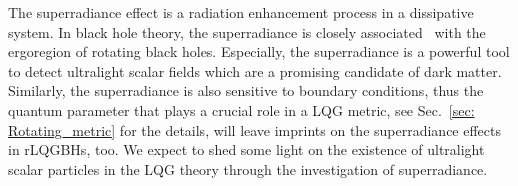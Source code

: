 \documentclass[12pt]{article}
\begin{document}



The superradiance effect is  a radiation enhancement process in a dissipative system. In black hole theory, the superradiance is closely associated~\cite{PressTeukolsky1972, Bekenstein1973, Zeldovich1971, StarobinskyChurilov1973} with the ergoregion of rotating black holes.   Especially, the superradiance is a powerful tool to detect \cite{Brito:2015oca,East:2018glu} ultralight scalar fields which are a promising candidate of dark matter. Similarly, the superradiance is also sensitive to boundary conditions, thus the quantum parameter that plays a crucial role in a LQG metric, see Sec.~\ref{sec: Rotating_metric} for the details, will leave imprints on the superradiance effects in rLQGBHs, too. We expect to shed some light on the existence of ultralight scalar particles in the LQG theory through the investigation of superradiance. 
\end{document}
